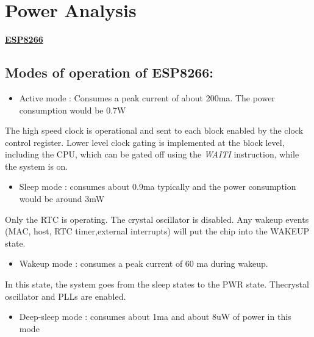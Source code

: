 \documentclass[16pt]{article}
\begin{document}
\vspace{13cm}

\section{Power Analysis}
\vspace{0.5cm}

{\Large{\underline{\textbf{ESP8266}}}}

\vspace{0.2cm}

\subsection{Modes of operation of ESP8266:}

\begin{itemize}

\item
  Active mode : Consumes a peak current of about 200ma. The power
  consumption would be 0.7W
\end{itemize}

The high speed clock is operational and sent to each block enabled by
the clock control register. Lower level clock gating is implemented at
the block level, including the CPU, which can be gated off using the
\emph{WAITI} instruction, while the system is on.

\begin{itemize}

\item
  Sleep mode : consumes about 0.9ma typically and the power consumption
  would be around 3mW
\end{itemize}

Only the RTC is operating. The crystal oscillator is disabled. Any
wakeup events (MAC, host, RTC timer,external interrupts) will put the
chip into the WAKEUP state.

\begin{itemize}

\item
  Wakeup mode : consumes a peak current of 60 ma during wakeup.
\end{itemize}

In this state, the system goes from the sleep states to the PWR state.
Thecrystal oscillator and PLLs are enabled.

\begin{itemize}

\item
  Deep-sleep mode : consumes about 1ma and about 8uW of power in this
  mode
\end{itemize}
\end{document}
